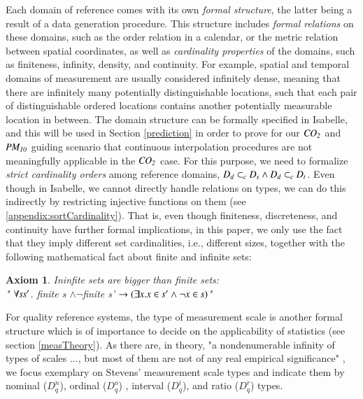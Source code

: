 \documentclass[final,authoryear,1p,times]{elsarticle}
\newtheorem{Axiom}{Axiom}
\begin{document}
Each domain of reference comes with its own \textit{formal structure}, the latter being a result of a data generation procedure. This structure includes \textit{formal relations} on these domains, such as the order relation in a calendar, or the metric relation between spatial coordinates, as well as \textit{cardinality properties} of the domains, such as finiteness, infinity, density, and continuity. For example, spatial and temporal domains of measurement are usually considered infinitely dense, meaning that there are infinitely many potentially distinguishable locations, such that each pair of distinguishable ordered locations contains another potentially measurable location in between. The domain structure can be formally specified in Isabelle, and this will be used in Section \ref{prediction} in order to prove for our ${\it CO_{2}}$ and ${\it PM_{10}}$ guiding scenario that continuous interpolation procedures are not meaningfully applicable in the ${\it CO_{2}}$ case. For this purpose, we need to formalize \textit{strict cardinality orders} among reference domains, ${\it D_d \subset_{c} D_s \wedge D_d \subset_{c} D_t}$. Even though in Isabelle, we cannot directly handle relations on types, we can do this indirectly by restricting injective functions on them (see \ref{appendix:sortCardinality}). That is, even though finiteness, discreteness, and continuity have further formal implications, in this paper, we only use the fact that they imply different set cardinalities, i.e., different sizes, together with the following mathematical fact about finite and infinite sets:
\begin{Axiom}
Ininfite sets are bigger than finite sets:\\
 " ${\it\forall s s'}$. finite s $\wedge \neg$finite s' ${\it \rightarrow (\exists x. x\in s' \wedge \neg x \in s)}$"
\label{ax:finitenessundinfinity}
\end{Axiom}

For quality reference systems, the type of measurement scale is another formal structure which is of importance to decide on the applicability of statistics (see section \ref{measTheory}). As there are, in theory, "a nondenumerable infinity of types of scales ..., but most of them are not of any real empirical significance" \citep[p.14]{Suppes1967}, we focus exemplary on Stevens' measurement scale types \citep{Stevens1946} and indicate them by nominal  ($D_{q}^n$), ordinal ($D_{q}^o$) , interval ($D_{q}^i$), and ratio ($D_{q}^r$) types. 
  
\end{document}
